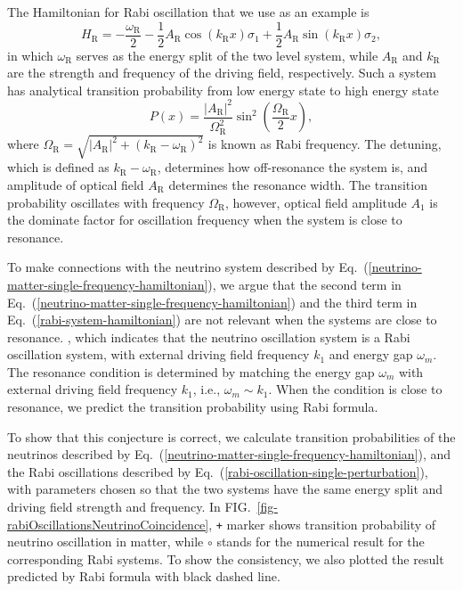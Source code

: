 \documentclass[%
preprint,
 amsmath,amssymb,
 aps,
]{revtex4-1}
\begin{document}
The Hamiltonian for Rabi oscillation that we use as an example is
\begin{equation}
    H_{\mathrm R} = - \frac{\omega_{\mathrm R}}{2} - \frac{1}{2}A_{\mathrm{R}} \cos (k_{\mathrm{R}} x) \sigma_1 + \frac{1}{2} A_{\mathrm{R}} \sin (k_{\mathrm{R}} x) \sigma_2,\label{rabi-oscillation-single-perturbation}
\end{equation}
in which $\omega_{\mathrm R}$ serves as the energy split of the two level system, while $A_{\mathrm{R}}$ and $k_{\mathrm{R}}$ are the strength and frequency of the driving field, respectively. Such a system has analytical transition probability from low energy state to high energy state
\begin{equation}
    P(x) = \frac{\left \lvert A_{\mathrm{R}} \right \rvert ^2}{ \Omega_{\mathrm R}^2 } \sin^2 \left( \frac{\Omega_{\mathrm R}}{2} x \right),
    \label{rabi-system-hamiltonian}
\end{equation}
where $\Omega_{\mathrm R} = \sqrt{ \lvert A_{\mathrm{R}}\rvert^2 + (k_{\mathrm{R}} - \omega_{\mathrm R})^2 }$ is known as Rabi frequency. The detuning, which is defined as $k_{\mathrm{R}} - \omega_{\mathrm R}$, determines how off-resonance the system is, and amplitude of optical field $A_{\mathrm{R}}$ determines the resonance width. The transition probability oscillates with frequency $\Omega_{\mathrm R}$, however, optical field amplitude $A_1$ is the dominate factor for oscillation frequency when the system is close to resonance.


To make connections with the neutrino system described by Eq.~(\ref{neutrino-matter-single-frequency-hamiltonian}), we argue that the second term in Eq.~(\ref{neutrino-matter-single-frequency-hamiltonian}) and the third term in Eq.~(\ref{rabi-system-hamiltonian}) are not relevant when the systems are close to resonance. , which indicates that the neutrino oscillation system is a Rabi oscillation system, with external driving field frequency $k_1$ and energy gap $\omega_m$. The resonance condition is determined by matching the energy gap $\omega_m$ with external driving field frequency $k_1$, i.e., $\omega_m \sim k_1$. When the condition is close to resonance, we predict the transition probability using Rabi formula.

To show that this conjecture is correct, we calculate transition probabilities of the neutrinos described by Eq.~(\ref{neutrino-matter-single-frequency-hamiltonian}), and the Rabi oscillations described by Eq.~(\ref{rabi-oscillation-single-perturbation}), with parameters chosen so that the two systems have the same energy split and driving field strength and frequency. In FIG.~\ref{fig-rabiOscillationsNeutrinoCoincidence}, \verb|+| marker shows transition probability of neutrino oscillation in matter, while $\circ$ stands for the numerical result for the corresponding Rabi systems. To show the consistency, we also plotted the result predicted by Rabi formula with black dashed line.
\end{document}
